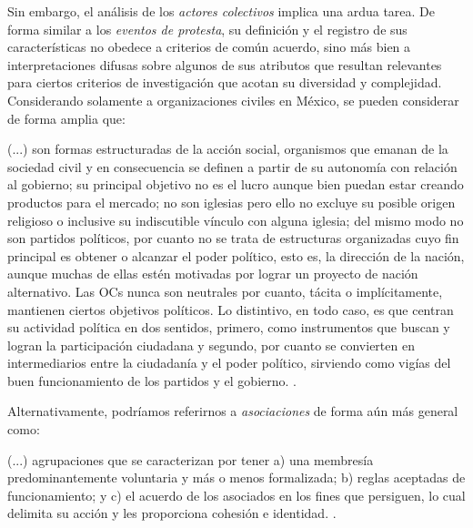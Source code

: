 \documentclass[letterpaper, 11pt]{book}
\theoremstyle{definition}
\theoremstyle{remark}
\begin{document}
Sin embargo, el análisis de los \emph{actores colectivos} implica una ardua tarea. De forma similar a los \emph{eventos de protesta}, su definición y el registro de sus características no obedece a criterios de común acuerdo, sino más bien a interpretaciones difusas sobre algunos de sus atributos que resultan relevantes para ciertos criterios de investigación que acotan su diversidad y complejidad. Considerando solamente a organizaciones civiles en México, se pueden considerar de forma amplia que:


\begin{center}
    \begin{minipage}{0.9\linewidth}
        {\setlength{\parindent}{12pt}\small
	    (...) son formas estructuradas de la acción social, organismos que emanan de la sociedad civil y en consecuencia se definen a partir de su autonomía con relación al gobierno; su principal objetivo no es el lucro aunque bien puedan estar creando productos para el mercado; no son iglesias pero ello no excluye su posible origen religioso o inclusive su indiscutible vínculo con alguna iglesia; del mismo modo no son partidos políticos, por cuanto no se trata de estructuras organizadas cuyo fin principal es obtener o alcanzar el poder político, esto es, la dirección de la nación, aunque muchas de ellas estén motivadas por lograr un proyecto de nación alternativo. Las OCs nunca son neutrales por cuanto, tácita o implícitamente, mantienen ciertos objetivos políticos. Lo distintivo, en todo caso, es que centran su actividad política en dos sentidos, primero, como instrumentos que buscan y logran la participación ciudadana y segundo, por cuanto se convierten en intermediarios entre la ciudadanía y el poder político, sirviendo como vigías del buen funcionamiento de los partidos y el gobierno.  \normalsize \citep[75--76]{2015_Calvillo_DimensionesOC}.
        }
    \end{minipage}
\end{center}


Alternativamente, podríamos referirnos a \emph{asociaciones} de forma aún más general como:


\begin{center}
    \begin{minipage}{0.9\linewidth}
        {\setlength{\parindent}{12pt}\small
	     (...) agrupaciones que se caracterizan por tener a) una membresía predominantemente voluntaria y más o menos formalizada; b) reglas aceptadas de funcionamiento; y c) el acuerdo de los asociados en los fines que persiguen, lo cual delimita su acción y les proporciona cohesión e identidad.  \normalsize \citep[85]{2012_REDA_EvaluacionAsociaciones}.
        }
    \end{minipage}
\end{center}
\end{document}
